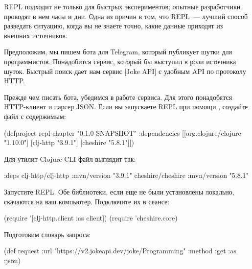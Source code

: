 REPL подходит не только для быстрых экспериментов; опытные разработчики проводят в нем часы и дни. Одна из причин в том, что REPL~--- лучший способ разведать ситуацию, когда вы не знаете точно, какие данные приходят из внешних источников.

\def\urljokeapi{https://jokeapi.dev/}

Предположим, мы пишем бота для Telegram, который публикует шутки для программистов. Понадобится сервис, который бы выступил в роли источника шуток. Быстрый поиск дает нам сервис \footurl{Joke API}{\urljokeapi}[Joke API] с удобным API по протоколу HTTP.

Прежде чем писать бота, убедимся в работе сервиса. Для этого понадобятся HTTP-клиент и парсер JSON. Если вы запускаете REPL при помощи , создайте файл  с содержимым:

\begin{english}
  \begin{clojure}
(defproject repl-chapter "0.1.0-SNAPSHOT"
  :dependencies [[org.clojure/clojure "1.10.0"]
                 [clj-http "3.9.1"]
                 [cheshire "5.8.1"]])
  \end{clojure}
\end{english}

Для утилит Clojure CLI файл  выглядит так:

\begin{english}
  \begin{clojure}
{:deps
 {clj-http/clj-http {:mvn/version "3.9.1"}
  cheshire/cheshire {:mvn/version "5.8.1"}}}
  \end{clojure}
\end{english}

Запустите REPL. Обе библиотеки, если еще не были установлены локально, скачаются на ваш компьютер. Подключите их в сеансе:

\begin{english}
  \begin{clojure}
(require '[clj-http.client :as client])
(require 'cheshire.core)
  \end{clojure}
\end{english}

Подготовим словарь запроса:

\begin{english}
  \begin{clojure}
(def request
  {:url "https://v2.jokeapi.dev/joke/Programming"
   :method :get
   :as :json})
  \end{clojure}
\end{english}

